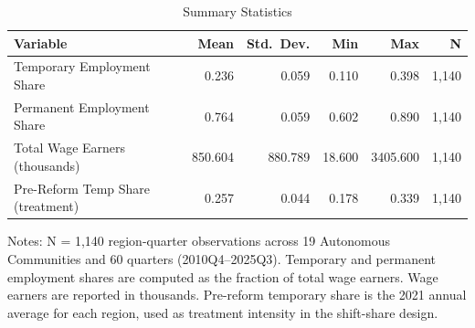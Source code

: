 \begin{table}[H]
\centering
\caption{Summary Statistics}
\begin{threeparttable}
\begin{tabular}{lrrrrr}
\toprule
Variable & Mean & Std.\ Dev. & Min & Max & N \\
\midrule
Temporary Employment Share & 0.236 & 0.059 & 0.110 & 0.398 & 1,140 \\
Permanent Employment Share & 0.764 & 0.059 & 0.602 & 0.890 & 1,140 \\
Total Wage Earners (thousands) & 850.604 & 880.789 & 18.600 & 3405.600 & 1,140 \\
Pre-Reform Temp Share (treatment) & 0.257 & 0.044 & 0.178 & 0.339 & 1,140 \\
\bottomrule
\end{tabular}
\begin{tablenotes}[flushleft]
\small
\item Notes: N = 1,140 region-quarter observations across 19 Autonomous Communities and 60 quarters (2010Q4--2025Q3). Temporary and permanent employment shares are computed as the fraction of total wage earners. Wage earners are reported in thousands. Pre-reform temporary share is the 2021 annual average for each region, used as treatment intensity in the shift-share design.
\end{tablenotes}
\end{threeparttable}
\label{tab:summary}
\end{table}

